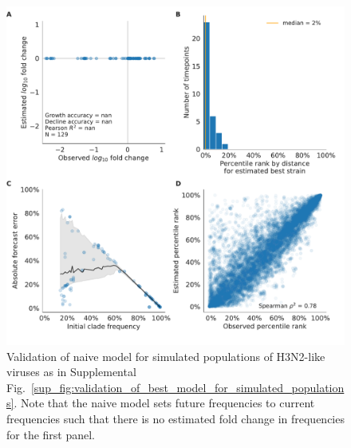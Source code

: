 \begin{figure}[H]
  \begin{center}
  \includegraphics[width=\textwidth]{figures/validation_figure_simulated-simulated_sample_3-naive.pdf}
  \caption{
  Validation of naive model for simulated populations of H3N2-like viruses as in Supplemental Fig.~\ref{sup_fig:validation_of_best_model_for_simulated_populations}.
  Note that the naive model sets future frequencies to current frequencies such that there is no estimated fold change in frequencies for the first panel.
  }
  \label{sup_fig:validation_of_naive_model_for_simulated_populations}
  \end{center}
\end{figure}

